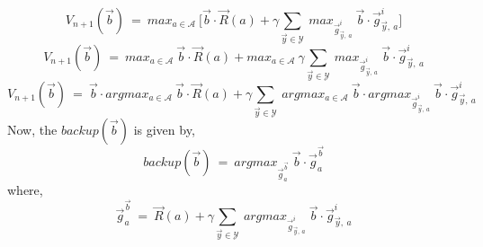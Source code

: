 \documentclass[12pt, draftcls, onecolumn]{IEEEtran}
\begin{document}
\begin{itemize}
\begin{equation*}
            V_{n+1}(\vec{b})\ =\ max_{a \in \mathcal{A}}\ \Big[\vec{b} \cdot \vec{R}(a) + \gamma \sum_{\vec{y} \in \mathcal{Y}}\ max_{\vec{g}_{\vec{y},\ a}^i}\ \vec{b} \cdot \vec{g}_{\vec{y},\ a}^i\Big]
    \end{equation*}
    \begin{equation*}
            V_{n+1}(\vec{b})\ =\ max_{a \in \mathcal{A}}\ \vec{b} \cdot \vec{R}(a) + max_{a \in \mathcal{A}}\ \gamma \sum_{\vec{y} \in \mathcal{Y}}\ max_{\vec{g}_{\vec{y},\ a}^i}\ \vec{b} \cdot \vec{g}_{\vec{y},\ a}^i
    \end{equation*}
    \begin{equation*}
            V_{n+1}(\vec{b})\ =\ \vec{b} \cdot argmax_{a \in \mathcal{A}}\ \vec{b} \cdot \vec{R}(a) + \gamma \sum_{\vec{y} \in \mathcal{Y}}\ argmax_{a \in \mathcal{A}}\ \vec{b} \cdot argmax_{\vec{g}_{\vec{y},\ a}^i}\ \vec{b} \cdot \vec{g}_{\vec{y},\ a}^i
    \end{equation*}
    Now, the $backup(\vec{b})$ is given by,
    \begin{equation}\label{101}
            backup(\vec{b})\ =\ argmax_{\vec{g}_a^{\vec{b}}}\ \vec{b} \cdot \vec{g}_a^{\vec{b}}
    \end{equation}
    where,
    \[\vec{g}_a^{\vec{b}}\ =\ \vec{R}(a) + \gamma \sum_{\vec{y} \in \mathcal{Y}}\ argmax_{\vec{g}_{\vec{y},\ a}^i}\ \vec{b} \cdot \vec{g}_{\vec{y},\ a}^i\]
\end{itemize}
\end{document}
